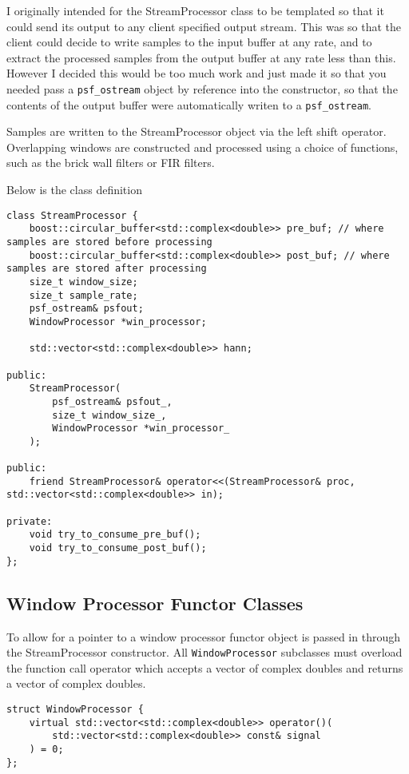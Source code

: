 I originally intended for the StreamProcessor class to be templated so that 
it could send its output to any client specified output stream.
This was so that the client could decide to write samples to the input buffer
at any rate, and to extract the processed samples from the output buffer
at any rate less than this.
However I decided this would be too much work and just made it so that you 
needed pass a \verb|psf_ostream| object by reference into the constructor, so that
the contents of the output buffer were automatically writen to a \verb|psf_ostream|.

Samples are written to the StreamProcessor object via the left shift operator.
Overlapping windows are constructed and processed using a choice of functions,
such as the brick wall filters or FIR filters.

Below is the class definition
\begin{verbatim}
class StreamProcessor {
    boost::circular_buffer<std::complex<double>> pre_buf; // where samples are stored before processing
    boost::circular_buffer<std::complex<double>> post_buf; // where samples are stored after processing
    size_t window_size;
    size_t sample_rate;
    psf_ostream& psfout;
    WindowProcessor *win_processor;

    std::vector<std::complex<double>> hann;

public:
    StreamProcessor(   
        psf_ostream& psfout_, 
        size_t window_size_,
        WindowProcessor *win_processor_
    );

public:
    friend StreamProcessor& operator<<(StreamProcessor& proc, std::vector<std::complex<double>> in);

private:
    void try_to_consume_pre_buf();
    void try_to_consume_post_buf();
};
\end{verbatim}

\pagebreak

\subsection{Window Processor Functor Classes}
To allow for 
a pointer to a window processor functor object is passed in through the StreamProcessor constructor.
All \verb|WindowProcessor| subclasses must overload the function call operator which 
accepts a vector of complex doubles and returns a vector of complex doubles.

\begin{verbatim}
struct WindowProcessor {
    virtual std::vector<std::complex<double>> operator()(
        std::vector<std::complex<double>> const& signal
    ) = 0;
};
\end{verbatim}

